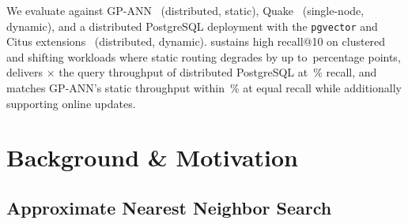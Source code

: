 \documentclass[sigconf,review,anonymous]{acmart}
\begin{document}
We evaluate \SystemName{} against GP-ANN~\cite{gottensuren2025unleashing} (distributed, static), Quake~\cite{mohoney2025quake} (single-node, dynamic), and a distributed PostgreSQL deployment with the \texttt{pgvector} and Citus extensions~\cite{postgresql, pgvector, cubukcu2021citus} (distributed, dynamic). \SystemName{} sustains high recall@10 on clustered and shifting workloads where static routing degrades by up to \,percentage points, delivers $\times$ the query throughput of distributed PostgreSQL at \,\% recall, and matches GP-ANN's static throughput within \,\% at equal recall while additionally supporting online updates.








\section{Background \& Motivation}

\subsection{Approximate Nearest Neighbor Search}
\end{document}
